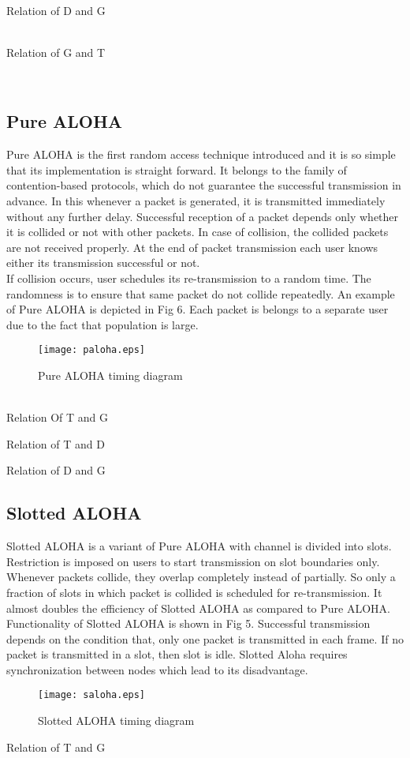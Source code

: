 \documentclass[10pt, conference, compsocconf]{IEEEtran}
\begin{document}
\\
Relation of D and G

\\
Relation of G and T

\\
\subsection{Pure ALOHA}
Pure ALOHA is the first random access technique introduced and it is so simple that its implementation is straight forward. It belongs to the family of contention-based protocols, which do not guarantee the successful transmission in advance. In this whenever a packet is generated, it is transmitted immediately without any further delay. Successful reception of a packet depends only whether it is collided or not with other packets. In case of collision, the collided packets are not received properly. At the end of packet transmission each user knows either its transmission successful or not.
\\
\indent If collision occurs, user schedules its re-transmission to a random time. The randomness is to ensure that same packet do not collide repeatedly. An example of Pure ALOHA is depicted in Fig 6. Each packet is belongs to a separate user due to the fact that population is large.
\begin{figure}[!h]
\centering
\caption{Pure ALOHA timing diagram}
\texttt{[image: paloha.eps]}
\end{figure}
\\
Relation Of T and G

Relation of T and D

Relation of D and G


\subsection{Slotted ALOHA}
Slotted ALOHA is a variant of Pure ALOHA with channel is divided into slots. Restriction is imposed on users to start transmission on slot boundaries only. Whenever packets collide, they overlap completely instead of partially. So only a fraction of slots in which packet is collided is scheduled for re-transmission. It almost doubles the efficiency of Slotted ALOHA as compared to Pure ALOHA.
Functionality of Slotted ALOHA is shown in Fig 5. Successful transmission depends on the condition that, only one packet is transmitted in each frame. If no packet is transmitted in a slot, then slot is idle. Slotted Aloha requires synchronization between nodes which lead to its disadvantage.
\begin{figure}[!h]
\centering
\caption{Slotted ALOHA timing diagram}
\texttt{[image: saloha.eps]}
\end{figure}
Relation of T and G
\end{document}
